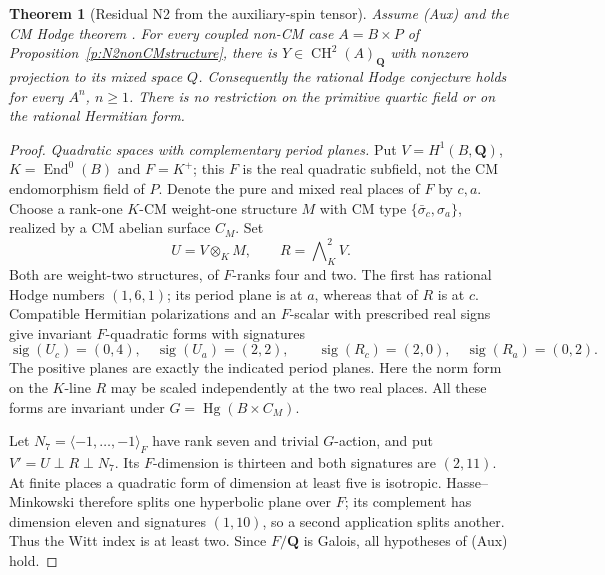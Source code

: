 \documentclass[11pt,reqno]{article}
\theoremstyle{emphasizedplain}
\newtheorem{theorem}{Theorem}[section]
\theoremstyle{emphasizeddefinition}
\theoremstyle{emphasizeddefinition}
\DeclareMathOperator{\End}{End}
\DeclareMathOperator{\Hg}{Hg}
\DeclareMathOperator{\CH}{CH}
\newcommand{\Q}{\mathbf Q}
\begin{document}
\begin{theorem}[Residual N2 from the auxiliary-spin tensor]
\label{p:N2auxiliary}
Assume (Aux) and the CM Hodge theorem
\cite[Theorem 1.1]{OpenAICM}. For every coupled non-CM case
$A=B\times P$ of Proposition~\ref{p:N2nonCMstructure}, there is
$Y\in\CH^2(A)_\Q$ with nonzero projection to its mixed space $Q$.
Consequently the rational Hodge conjecture holds for every $A^n$,
$n\geq1$. There is no restriction on the primitive quartic field
or on the rational Hermitian form.
\end{theorem}
\begin{proof}
\emph{Quadratic spaces with complementary period planes.}
Put $V=H^1(B,\Q)$, $K=\End^0(B)$ and $F=K^+$; this $F$ is the
real quadratic subfield, not the CM endomorphism field of $P$.
Denote the pure and mixed real places of $F$ by $c,a$.
Choose a rank-one $K$-CM weight-one structure $M$ with CM type
$\{\bar\sigma_c,\sigma_a\}$, realized by a CM abelian surface $C_M$.
Set
\[
 U=V\otimes_KM,\qquad R=\bigwedge\nolimits_K^2V.
\]
Both are weight-two structures, of $F$-ranks four and two.
The first has rational Hodge numbers $(1,6,1)$; its period plane
is at $a$, whereas that of $R$ is at $c$.
Compatible Hermitian polarizations and an $F$-scalar with prescribed
real signs give invariant $F$-quadratic forms with signatures
\[
 \operatorname{sig}(U_c)=(0,4),\quad
 \operatorname{sig}(U_a)=(2,2),\qquad
 \operatorname{sig}(R_c)=(2,0),\quad
 \operatorname{sig}(R_a)=(0,2).
                                                        \tag{N2.2}
\]
The positive planes are exactly the indicated period planes.
Here the norm form on the $K$-line $R$ may be scaled independently
at the two real places. All these forms are invariant under
$G=\Hg(B\times C_M)$.

Let $N_7=\langle-1,\ldots,-1\rangle_F$ have rank seven and trivial
$G$-action, and put $V'=U\perp R\perp N_7$.
Its $F$-dimension is thirteen and both signatures are $(2,11)$.
At finite places a quadratic form of dimension at least five is
isotropic. Hasse--Minkowski therefore splits one hyperbolic plane
over $F$; its complement has dimension eleven and signatures
$(1,10)$, so a second application splits another.
Thus the Witt index is at least two. Since $F/\Q$ is Galois,
all hypotheses of (Aux) hold.


\end{proof}
\end{document}

